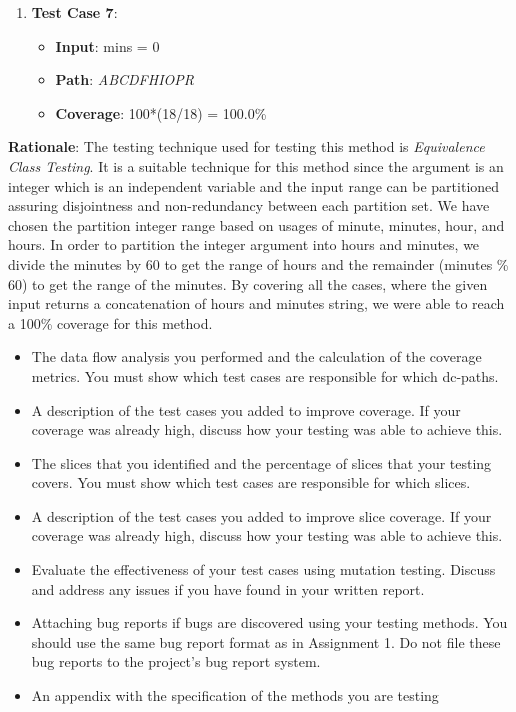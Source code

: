 \documentclass[fontsize=12pt,paper=letter,twoside]{scrartcl}
\begin{document}
\begin{enumerate}
\item \textbf{Test Case 7}:
\begin{itemize}
\item \textbf{Input}: mins = 0
\item \textbf{Path}: \emph{ABCDFHIOPR}
\item \textbf{Coverage}: 100*(18/18) = 100.0\%
\end{itemize}

\end{enumerate}

\noindent \textbf{Rationale}: The testing technique used for testing this method is \emph{Equivalence Class Testing}. It is a suitable technique for this method since the argument is an integer which is an independent variable and the input range can be partitioned assuring disjointness and non-redundancy between each partition set. We have chosen the partition integer range based on usages of minute, minutes, hour, and hours. In order to partition the integer argument into hours and minutes, we divide the minutes by 60 to get the range of hours and the remainder (minutes \% 60) to get the range of the minutes. By covering all the cases, where the given input returns a concatenation of hours and minutes string, we were able to reach a 100\% coverage for this method.

\newpage
\begin{itemize}
\item The data flow analysis you performed and the calculation of the coverage metrics. You must
show which test cases are responsible for which dc-paths.
\item A description of the test cases you added to improve coverage. If your coverage was already high,
discuss how your testing was able to achieve this.
\item The slices that you identified and the percentage of slices that your testing covers. You must
show which test cases are responsible for which slices.
\item A description of the test cases you added to improve slice coverage. If your coverage was
already high, discuss how your testing was able to achieve this.
\item Evaluate the effectiveness of your test cases using mutation testing. Discuss and address any
issues if you have found in your written report.
\item Attaching bug reports if bugs are discovered using your testing methods. You should use the
same bug report format as in Assignment 1. Do not file these bug reports to the project’s bug
report system.
\item An appendix with the specification of the methods you are testing
\end{itemize}
\end{document}
